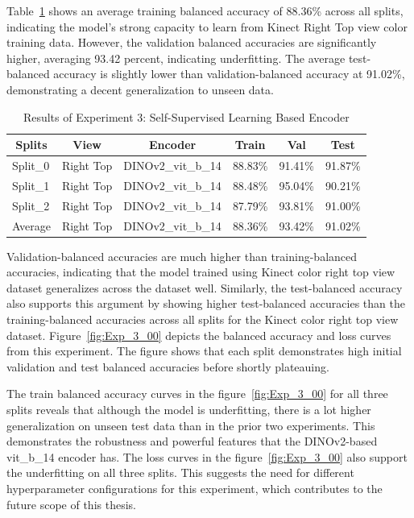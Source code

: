 Table~\ref{table:experiment 3 results} shows an average training balanced accuracy of 88.36\% across all splits, indicating the model's strong capacity to learn from Kinect Right Top view color training data. However, the validation balanced accuracies are significantly higher, averaging 93.42 percent, indicating underfitting. The average test-balanced accuracy is slightly lower than validation-balanced accuracy at 91.02\%, demonstrating a decent generalization to unseen data.
\begin{table}[htbp]
\caption{Results of Experiment 3: Self-Supervised Learning Based Encoder}
\label{table:experiment 3 results}
\centering
\begin{tabular}{llllll}
\multicolumn{1}{c}{\textbf{Splits}} & \multicolumn{1}{c}{\textbf{View}} & \multicolumn{1}{c}{\textbf{Encoder}} & \multicolumn{1}{c}{\textbf{Train}} & \multicolumn{1}{c}{\textbf{Val}} & \multicolumn{1}{c}{\textbf{Test}}\\
\hline
Split\_0 & Right Top & DINOv2\_vit\_b\_14 & 88.83\% & 91.41\% & 91.87\% \\
Split\_1 & Right Top & DINOv2\_vit\_b\_14 & 88.48\% & 95.04\% & 90.21\% \\
Split\_2 & Right Top & DINOv2\_vit\_b\_14 & 87.79\% & 93.81\% & 91.00\% \\
\hline
Average & Right Top & DINOv2\_vit\_b\_14 & 88.36\% & 93.42\% & 91.02\% \\
\hline
\end{tabular}
\end{table}

Validation-balanced accuracies are much higher than training-balanced accuracies, indicating that the model trained using Kinect color right top view dataset generalizes across the dataset well. Similarly, the test-balanced accuracy also supports this argument by showing higher test-balanced accuracies than the training-balanced accuracies across all splits for the Kinect color right top view dataset. Figure~\ref{fig:Exp_3_00} depicts the balanced accuracy and loss curves from this experiment. The figure shows that each split demonstrates high initial validation and test balanced accuracies before shortly plateauing. 

The train balanced accuracy curves in the figure~\ref{fig:Exp_3_00} for all three splits reveals that although the model is underfitting, there is a lot higher generalization on unseen test data than in the prior two experiments. This demonstrates the robustness and powerful features that the DINOv2-based vit\_b\_14 encoder has. The loss curves in the figure~\ref{fig:Exp_3_00} also support the underfitting on all three splits. This suggests the need for different hyperparameter configurations for this experiment, which contributes to the future scope of this thesis.

